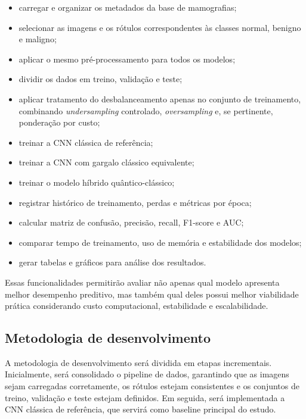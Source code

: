 \documentclass[
    12pt,
    openright,
    oneside,
    a4paper,
    english,
    brazil
]{abntex2}
\begin{document}
\begin{itemize}
    \item carregar e organizar os metadados da base de mamografias;
    \item selecionar as imagens e os rótulos correspondentes às classes normal, benigno e maligno;
    \item aplicar o mesmo pré-processamento para todos os modelos;
    \item dividir os dados em treino, validação e teste;
    \item aplicar tratamento do desbalanceamento apenas no conjunto de treinamento, combinando \textit{undersampling} controlado, \textit{oversampling} e, se pertinente, ponderação por custo;
    \item treinar a CNN clássica de referência;
    \item treinar a CNN com gargalo clássico equivalente;
    \item treinar o modelo híbrido quântico-clássico;
    \item registrar histórico de treinamento, perdas e métricas por época;
    \item calcular matriz de confusão, precisão, recall, F1-score e AUC;
    \item comparar tempo de treinamento, uso de memória e estabilidade dos modelos;
    \item gerar tabelas e gráficos para análise dos resultados.
\end{itemize}

Essas funcionalidades permitirão avaliar não apenas qual modelo apresenta melhor desempenho preditivo, mas também qual deles possui melhor viabilidade prática considerando custo computacional, estabilidade e escalabilidade.

\subsection{Metodologia de desenvolvimento}
\label{subsec:metodologia_desenvolvimento}

A metodologia de desenvolvimento será dividida em etapas incrementais. Inicialmente, será consolidado o pipeline de dados, garantindo que as imagens sejam carregadas corretamente, os rótulos estejam consistentes e os conjuntos de treino, validação e teste estejam definidos. Em seguida, será implementada a CNN clássica de referência, que servirá como baseline principal do estudo.
\end{document}
